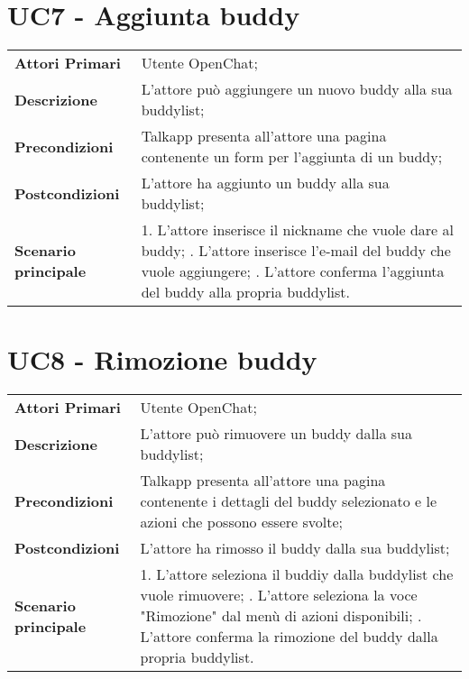 \section{UC7 - Aggiunta buddy}
	\begin{center}
	\bgroup
	\def\arraystretch{1.8}     
	\begin{longtable}{  p{4cm} | p{9.5cm} } 
		\textbf{Attori Primari} & Utente OpenChat; \\ 
		\textbf{Descrizione} &  L'attore può aggiungere un nuovo buddy alla sua buddylist; \\ 
		\textbf{Precondizioni}  & Talkapp presenta all'attore una pagina contenente un form per l'aggiunta di un buddy; \\
		\textbf{Postcondizioni} & L'attore ha aggiunto un buddy alla sua buddylist;  \\ 
		\textbf{Scenario principale} & 
		1. L'attore inserisce il nickname che vuole dare al buddy; \newline
		2. L'attore inserisce l'e-mail del buddy che vuole aggiungere; \newline
		3. L'attore conferma l'aggiunta del buddy alla propria buddylist.
	\end{longtable}
	\egroup
\end{center}

\section{UC8 - Rimozione buddy}
	\begin{center}
	\bgroup
	\def\arraystretch{1.8}     
	\begin{longtable}{  p{4cm} | p{9.5cm} } 
		\textbf{Attori Primari} & Utente OpenChat; \\ 
		\textbf{Descrizione} &  L'attore può rimuovere un buddy dalla sua buddylist; \\ 
		\textbf{Precondizioni}  & Talkapp presenta all'attore una pagina contenente i dettagli del buddy selezionato e le azioni che possono essere svolte; \\
		\textbf{Postcondizioni} & L'attore ha rimosso il buddy dalla sua buddylist;  \\ 
		\textbf{Scenario principale} & 
		1. L'attore seleziona il buddiy dalla buddylist che vuole rimuovere; \newline
		2. L'attore seleziona la voce "Rimozione" dal menù di azioni disponibili; \newline
		3. L'attore conferma la rimozione del buddy dalla propria buddylist.
	\end{longtable}
	\egroup
\end{center}

